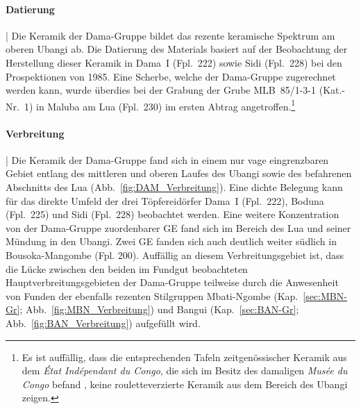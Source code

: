 \paragraph{Datierung}\hspace{-.5em}|\hspace{.5em}%
Die Keramik der Dama-Gruppe bildet das rezente keramische Spektrum am oberen \mbox{Ubangi} ab. Die Datierung des Materials basiert auf der Beobachtung der Herstellung dieser Keramik in Dama~I (Fpl.~222) sowie Sidi (Fpl.~228) bei den Prospektionen von 1985. Eine Scherbe, welche der Dama-Gruppe zugerechnet werden kann, wurde überdies bei der Grabung der Grube MLB~85/1-3-1 (Kat.-Nr.~1) in Maluba am Lua (Fpl.~230) im ersten Abtrag angetroffen.\footnote{Es ist auffällig, dass die entsprechenden Tafeln zeitgenössischer Keramik aus dem \textit{État Indépendant du Congo}, die sich im Besitz des damaligen \textit{Musée du Congo} befand \parencite[Taf.~XIV--XV]{Coart.1907}, keine rouletteverzierte Keramik aus dem Bereich des \mbox{Ubangi} zeigen.\label{ftn:Coart1907RouletteUbangi}}

\paragraph{Verbreitung}\hspace{-.5em}|\hspace{.5em}%
Die Keramik der Dama-Gruppe fand sich in einem nur vage eingrenzbaren Gebiet entlang des mittleren und oberen Laufes des \mbox{Ubangi} sowie des befahrenen Abschnitts des Lua (Abb.~\ref{fig:DAM_Verbreitung}). Eine dichte Belegung kann für das direkte Umfeld der drei Töpfereidörfer Dama~I (Fpl.~222), Boduna (Fpl.~225) und Sidi (Fpl.~228) beobachtet werden. Eine weitere Konzentration von der Dama-Gruppe zuordenbarer GE fand sich im Bereich des Lua und seiner Mündung in den \mbox{Ubangi}. Zwei GE fanden sich auch deutlich weiter südlich in Bousoka-Mangombe (Fpl. 200). Auffällig an diesem Verbreitungsgebiet ist, dass die Lücke zwischen den beiden im Fundgut beobachteten Hauptverbreitungsgebieten der Dama-Gruppe teilweise durch die Anwesenheit von Funden der ebenfalls rezenten Stilgruppen Mbati-Ngombe (Kap.~\ref{sec:MBN-Gr}; Abb.~\ref{fig:MBN_Verbreitung}) und Bangui (Kap.~\ref{sec:BAN-Gr}; Abb.~\ref{fig:BAN_Verbreitung}) aufgefüllt wird.